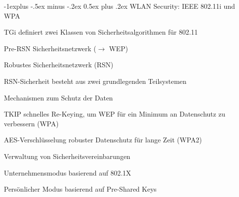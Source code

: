 \documentclass[a4paper]{article}
\makeatletter
\renewcommand{\subsection}{\@startsection{subsection}{2}{0mm}%
 {-1explus -.5ex minus -.2ex}%
 {0.5ex plus .2ex}%
 {\normalfont\normalsize\bfseries}}
\makeatother
\begin{document}
\begin{multicols}{3}
      \subsection{WLAN Security: IEEE 802.11i und WPA}
      \begin{itemize*}
            \item TGi definiert zwei Klassen von Sicherheitsalgorithmen für 802.11
            \begin{itemize*}
                  \item Pre-RSN Sicherheitsnetzwerk ($\rightarrow$ WEP)
                  \item Robustes Sicherheitsnetzwerk (RSN)
            \end{itemize*}
            \item RSN-Sicherheit besteht aus zwei grundlegenden Teilsystemen
            \begin{itemize*}
                  \item Mechanismen zum Schutz der Daten
                  \begin{description*}
                        \item[TKIP] schnelles Re-Keying, um WEP für ein Minimum an Datenschutz zu verbessern (WPA)
                        \item[AES-Verschlüsselung] robuster Datenschutz für lange Zeit (WPA2)
                  \end{description*}
                  \item Verwaltung von Sicherheitsvereinbarungen
                  \begin{description*}
                        \item[Unternehmensmodus] basierend auf 802.1X
                        \item[Persönlicher Modus] basierend auf Pre-Shared Keys
                  \end{description*}
            \end{itemize*}
      \end{itemize*}


\end{multicols}
\end{document}
